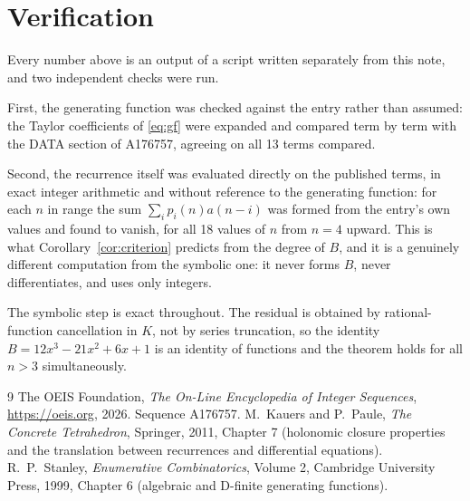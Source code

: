 \documentclass[11pt,a4paper]{article}
\theoremstyle{plain}
\theoremstyle{definition}
\begin{document}
\section{Verification}

Every number above is an output of a script written separately from this note, and two
independent checks were run.

First, the generating function was checked against the entry rather than assumed: the
Taylor coefficients of \eqref{eq:gf} were expanded and compared term by term with the DATA
section of A176757, agreeing on all 13 terms compared.

Second, the recurrence itself was evaluated directly on the published terms, in exact
integer arithmetic and without reference to the generating function: for each $n$ in range
the sum $\sum_{i}p_{i}(n)a(n-i)$ was formed from the entry's own values and found to
vanish, for all 18 values of $n$ from $n=4$ upward. This is what
Corollary~\ref{cor:criterion} predicts from the degree of $B$, and it is a genuinely
different computation from the symbolic one: it never forms $B$, never differentiates, and
uses only integers.

The symbolic step is exact throughout. The residual is obtained by rational-function
cancellation in $K$, not by series truncation, so the identity $B=12 x^{3} - 21 x^{2} + 6 x + 1$ is an
identity of functions and the theorem holds for all $n>3$ simultaneously.

\begin{thebibliography}{9}
 The OEIS Foundation, \emph{The On-Line Encyclopedia of Integer Sequences},
\url{https://oeis.org}, 2026. Sequence A176757.
 M.~Kauers and P.~Paule, \emph{The Concrete Tetrahedron}, Springer, 2011,
Chapter 7 (holonomic closure properties and the translation between recurrences and
differential equations).
 R.~P.~Stanley, \emph{Enumerative Combinatorics}, Volume 2, Cambridge
University Press, 1999, Chapter 6 (algebraic and D-finite generating functions).
\end{thebibliography}
\end{document}
